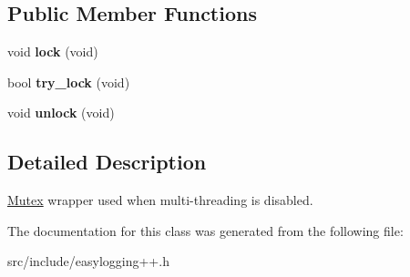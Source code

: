 \subsection*{Public Member Functions}
\begin{DoxyCompactItemize}
\item 
\mbox{\label{classel_1_1base_1_1threading_1_1internal_1_1_no_mutex_a3b38e4e9411c924daa70d358cf561b3c}} 
void {\bfseries lock} (void)
\item 
\mbox{\label{classel_1_1base_1_1threading_1_1internal_1_1_no_mutex_a4c0c35a99cf41f26a7608fed5609d6ae}} 
bool {\bfseries try\+\_\+lock} (void)
\item 
\mbox{\label{classel_1_1base_1_1threading_1_1internal_1_1_no_mutex_a5a248c97fee2ef0087526f2f8d3cd26e}} 
void {\bfseries unlock} (void)
\end{DoxyCompactItemize}


\subsection{Detailed Description}
\hyperlink{class_mutex}{Mutex} wrapper used when multi-\/threading is disabled. 

The documentation for this class was generated from the following file\+:\begin{DoxyCompactItemize}
\item 
src/include/easylogging++.\+h\end{DoxyCompactItemize}
